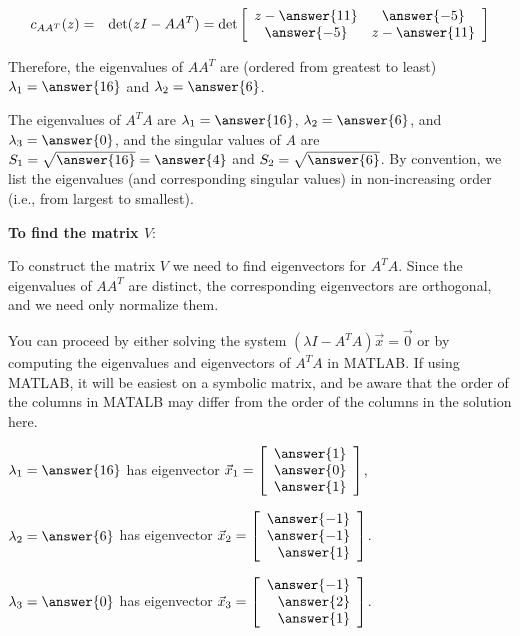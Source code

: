 \documentclass{ximera}
\begin{document}
\begin{example}
\begin{eqnarray*}
c_{AA^T}(z)& = &\det(zI-AA^T)=  \det \left[\begin{array}{cc}
  z-\answer{11} & \answer{-5} \\ 
  \answer{-5} & z-\answer{11} 
  \end{array}\right] \\
\end{eqnarray*}

Therefore, the eigenvalues of $AA^T$ are (ordered from greatest to least) $\lambda_1=\answer{16}$ and $\lambda_2=\answer{6}$.

The eigenvalues of $A^TA$ are $\lambda_1=\answer{16}$, $\lambda_2=\answer{6}$, and
$\lambda_3=\answer{0}$, and the singular values of $A$ are $S_1=\sqrt{\answer{16}}=\answer{4}$ and
$S_2=\sqrt{\answer{6}}$.
By convention, we list the eigenvalues (and corresponding singular values)
in non-increasing order (i.e., from largest to smallest).
 
\textbf{To find the matrix $V$}:
 
To construct the matrix $V$ we need to find eigenvectors for $A^TA$.
Since the eigenvalues of $AA^T$ are distinct, the corresponding
eigenvectors are orthogonal, and we need only normalize them.

You can proceed by either solving the system $(\lambda I-A^TA)\vec{x}= \vec{0}$ or by computing the eigenvalues and eigenvectors of $A^TA$ in MATLAB. If using MATLAB, it will be easiest on a symbolic matrix, and be aware that the order of the columns in MATALB may differ from the order of the columns in the solution here.
 
$\lambda_1=\answer{16}$ has eigenvector $\vec{x}_1=\left[\begin{array}{r} \answer{1} \\ \answer{0} \\ \answer{1} \end{array}\right]$,

$\lambda_2=\answer{6}$ has eigenvector $\vec{x}_2=\left[\begin{array}{r} \answer{-1} \\ \answer{-1} \\ \answer{1} \end{array}\right]$.

$\lambda_3=\answer{0}$ has eigenvector $\vec{x}_3=\left[\begin{array}{r} \answer{-1} \\ \answer{2} \\ \answer{1} \end{array}\right]$.


\end{example}
\end{document}
